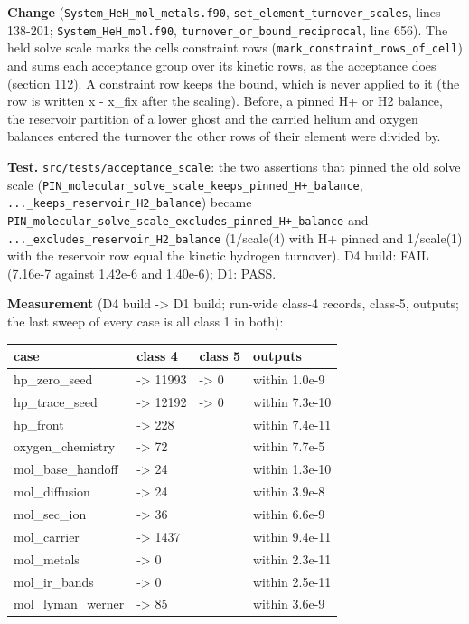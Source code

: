 \documentclass[english,a4paper]{my_memo}
\begin{document}
\textbf{Change} (\texttt{System\_HeH\_mol\_metals.f90}, \texttt{set\_element\_turnover\_scales},
lines 138-201; \texttt{System\_HeH\_mol.f90}, \texttt{turnover\_or\_bound\_reciprocal}, line
656). The held solve scale marks the cell\textquotesingle s constraint rows
(\texttt{mark\_constraint\_rows\_of\_cell}) and sums each acceptance group over its
kinetic rows, as the acceptance does (section 112). A constraint row keeps
the bound, which is never applied to it (the row is written x - x\_fix after
the scaling). Before, a pinned H+ or H2 balance, the reservoir partition of a
lower ghost and the carried helium and oxygen balances entered the turnover
the other rows of their element were divided by.

\textbf{Test.} \texttt{src/tests/acceptance\_scale}: the two assertions that pinned the old
solve scale (\texttt{PIN\_molecular\_solve\_scale\_keeps\_pinned\_H+\_balance},
\texttt{...\_keeps\_reservoir\_H2\_balance}) became
\texttt{PIN\_molecular\_solve\_scale\_excludes\_pinned\_H+\_balance} and
\texttt{...\_excludes\_reservoir\_H2\_balance} (1/scale(4) with H+ pinned and 1/scale(1)
with the reservoir row equal the kinetic hydrogen turnover). D4 build: FAIL
(7.16e-7 against 1.42e-6 and 1.40e-6); D1: PASS.

\textbf{Measurement} (D4 build -\textgreater{} D1 build; run-wide class-4 records, class-5,
outputs; the last sweep of every case is all class 1 in both):

{\def\LTcaptype{none} %
{\small
\begin{longtable}[]{@{}>{\raggedright\arraybackslash}p{\dimexpr(\linewidth-8\tabcolsep)/4\relax}>{\raggedright\arraybackslash}p{\dimexpr(\linewidth-8\tabcolsep)/4\relax}>{\raggedright\arraybackslash}p{\dimexpr(\linewidth-8\tabcolsep)/4\relax}>{\raggedright\arraybackslash}p{\dimexpr(\linewidth-8\tabcolsep)/4\relax}@{}}
\toprule\noalign{}
case & class 4 & class 5 & outputs \\
\midrule\noalign{}
\endhead
\bottomrule\noalign{}
\endlastfoot
hp\_zero\_seed & 12020 -\textgreater{} 11993 & 2 -\textgreater{} 0 & within 1.0e-9 \\
hp\_trace\_seed & 12218 -\textgreater{} 12192 & 3 -\textgreater{} 0 & within 7.3e-10 \\
hp\_front & 228 -\textgreater{} 228 & 0 & within 7.4e-11 \\
oxygen\_chemistry & 91 -\textgreater{} 72 & 0 & within 7.7e-5 \\
mol\_base\_handoff & 22 -\textgreater{} 24 & 0 & within 1.3e-10 \\
mol\_diffusion & 24 -\textgreater{} 24 & 0 & within 3.9e-8 \\
mol\_sec\_ion & 36 -\textgreater{} 36 & 0 & within 6.6e-9 \\
mol\_carrier & 1439 -\textgreater{} 1437 & 0 & within 9.4e-11 \\
mol\_metals & 0 -\textgreater{} 0 & 0 & within 2.3e-11 \\
mol\_ir\_bands & 0 -\textgreater{} 0 & 0 & within 2.5e-11 \\
mol\_lyman\_werner & 85 -\textgreater{} 85 & 0 & within 3.6e-9 \\
\end{longtable}
}
}
\end{document}
